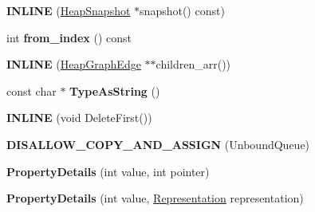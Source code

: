 \begin{DoxyCompactItemize}
\item 
{\bfseries I\+N\+L\+I\+NE} (\hyperlink{classv8_1_1internal_1_1_heap_snapshot}{Heap\+Snapshot} $\ast$snapshot() const)\hypertarget{classv8_1_1internal_1_1_b_a_s_e___e_m_b_e_d_d_e_d_afb3f506d4666efe0f7159681c44eeb1f}{}\label{classv8_1_1internal_1_1_b_a_s_e___e_m_b_e_d_d_e_d_afb3f506d4666efe0f7159681c44eeb1f}

\item 
int {\bfseries from\+\_\+index} () const \hypertarget{classv8_1_1internal_1_1_b_a_s_e___e_m_b_e_d_d_e_d_a22a30cfca154e1e0fd7770f781849dde}{}\label{classv8_1_1internal_1_1_b_a_s_e___e_m_b_e_d_d_e_d_a22a30cfca154e1e0fd7770f781849dde}

\item 
{\bfseries I\+N\+L\+I\+NE} (\hyperlink{classv8_1_1_heap_graph_edge}{Heap\+Graph\+Edge} $\ast$$\ast$children\+\_\+arr())\hypertarget{classv8_1_1internal_1_1_b_a_s_e___e_m_b_e_d_d_e_d_aaf30d1151c071adf2c92f69c113268c9}{}\label{classv8_1_1internal_1_1_b_a_s_e___e_m_b_e_d_d_e_d_aaf30d1151c071adf2c92f69c113268c9}

\item 
const char $\ast$ {\bfseries Type\+As\+String} ()\hypertarget{classv8_1_1internal_1_1_b_a_s_e___e_m_b_e_d_d_e_d_a545225b6ebda46ecfe84e42611b7214e}{}\label{classv8_1_1internal_1_1_b_a_s_e___e_m_b_e_d_d_e_d_a545225b6ebda46ecfe84e42611b7214e}

\item 
{\bfseries I\+N\+L\+I\+NE} (void Delete\+First())\hypertarget{classv8_1_1internal_1_1_b_a_s_e___e_m_b_e_d_d_e_d_aa465471353b38124aa37d1c6af1d8511}{}\label{classv8_1_1internal_1_1_b_a_s_e___e_m_b_e_d_d_e_d_aa465471353b38124aa37d1c6af1d8511}

\item 
{\bfseries D\+I\+S\+A\+L\+L\+O\+W\+\_\+\+C\+O\+P\+Y\+\_\+\+A\+N\+D\+\_\+\+A\+S\+S\+I\+GN} (Unbound\+Queue)\hypertarget{classv8_1_1internal_1_1_b_a_s_e___e_m_b_e_d_d_e_d_a4e36688bce3ebb8588c00c0ce6f4e564}{}\label{classv8_1_1internal_1_1_b_a_s_e___e_m_b_e_d_d_e_d_a4e36688bce3ebb8588c00c0ce6f4e564}

\item 
{\bfseries Property\+Details} (int value, int pointer)\hypertarget{classv8_1_1internal_1_1_b_a_s_e___e_m_b_e_d_d_e_d_a1028b65565e3d3e0eb6ce7f4094d18d6}{}\label{classv8_1_1internal_1_1_b_a_s_e___e_m_b_e_d_d_e_d_a1028b65565e3d3e0eb6ce7f4094d18d6}

\item 
{\bfseries Property\+Details} (int value, \hyperlink{classv8_1_1internal_1_1_representation}{Representation} representation)\hypertarget{classv8_1_1internal_1_1_b_a_s_e___e_m_b_e_d_d_e_d_ab58a3d30e2380003bf6fac28515c8e19}{}\label{classv8_1_1internal_1_1_b_a_s_e___e_m_b_e_d_d_e_d_ab58a3d30e2380003bf6fac28515c8e19}


\end{DoxyCompactItemize}
